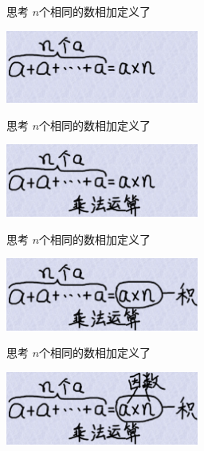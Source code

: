 \documentclass{beamer}
\begin{document}
\begin{frame}
  \begin{block}{思考}
    $n$个相同的数相加定义了\par\pause
    \includegraphics[width=2.5in]{times01.png}\par
  \end{block}
\end{frame}
\begin{frame}
  \begin{block}{思考}
    $n$个相同的数相加定义了\par
    \includegraphics[width=2.5in]{times02.png}\par
  \end{block}
\end{frame}
\begin{frame}
  \begin{block}{思考}
    $n$个相同的数相加定义了\par
    \includegraphics[width=2.5in]{times03.png}\par
  \end{block}
\end{frame}
\begin{frame}
  \begin{block}{思考}
    $n$个相同的数相加定义了\par
    \includegraphics[width=2.5in]{times04.png}\par
  \end{block}
\end{frame}
\end{document}

